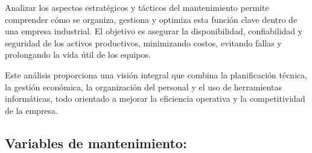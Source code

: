 \documentclass[a4paper,oneside,11pt]{article}
\begin{document}

Analizar los aspectos estratégicos y tácticos del mantenimiento permite comprender cómo se organiza, gestiona y optimiza esta función clave dentro de una empresa industrial. El objetivo es asegurar la disponibilidad, confiabilidad y seguridad de los activos productivos, minimizando costos, evitando fallas y prolongando la vida útil de los equipos.

Este análisis proporciona una visión integral que combina la planificación técnica, la gestión económica, la organización del personal y el uso de herramientas informáticas, todo orientado a mejorar la eficiencia operativa y la competitividad de la empresa.


\subsection{Variables de mantenimiento:}
\end{document}
